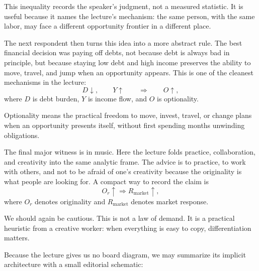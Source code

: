 \begin{remark}
This inequality records the speaker's judgment, not a measured statistic. It is useful because it names the lecture's mechanism: the same person, with the same labor, may face a different opportunity frontier in a different place.
\end{remark}

The next respondent then turns this idea into a more abstract rule. The best financial decision was paying off debts, not because debt is always bad in principle, but because staying low debt and high income preserves the ability to move, travel, and jump when an opportunity appears. This is one of the cleanest mechanisms in the lecture:
\begin{equation}
D \downarrow,\qquad Y \uparrow
\qquad \Longrightarrow \qquad
O \uparrow,
\end{equation}
where \(D\) is debt burden, \(Y\) is income flow, and \(O\) is optionality.

\begin{definition}
Optionality means the practical freedom to move, invest, travel, or change plans when an opportunity presents itself, without first spending months unwinding obligations.
\end{definition}

The final major witness is in music. Here the lecture folds practice, collaboration, and creativity into the same analytic frame. The advice is to practice, to work with others, and not to be afraid of one's creativity because the originality is what people are looking for. A compact way to record the claim is
\begin{equation}
O_r \uparrow \Longrightarrow R_{\text{market}} \uparrow,
\end{equation}
where \(O_r\) denotes originality and \(R_{\text{market}}\) denotes market response.

We should again be cautious. This is not a law of demand. It is a practical heuristic from a creative worker: when everything is easy to copy, differentiation matters.

Because the lecture gives us no board diagram, we may summarize its implicit architecture with a small editorial schematic:

